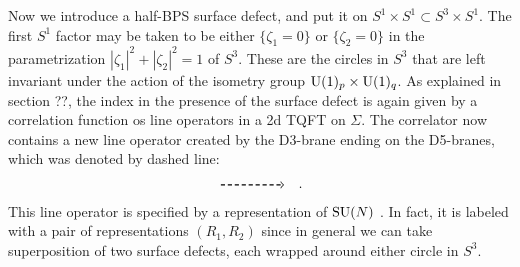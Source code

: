 Now we introduce a half-BPS surface defect, and put it on $S^{1} \times S^{1} \subset S^{3} \times S^{1}$.
The first $S^{1}$ factor may be taken to be either $\{\zeta_{1}=0\}$
or $\{\zeta_{2}=0\}$ in the parametrization $\left|\zeta_{1}\right|^{2}+\left|\zeta_{2}\right|^{2}=1$
of $S^{3}$. These are the circles in $S^{3}$ that are left invariant
under the action of the isometry group $\mathrm{U}(1)_{p} \times \mathrm{U}(1)_{q}$.
As explained in section ??, the index in the presence of the surface
defect is again given by a correlation function os line operators
in a 2d TQFT on $\Sigma$. The correlator now contains a new line
operator created by the D3-brane ending on the D5-branes, which was
denoted by dashed line:
\begin{equation}
    \begin{tikzpicture}[scale=1, baseline=(x.base)]    \node (x) at (0,0) {\vphantom{x}};

        \draw[thick, densely dashed, ->] (0,0) -- (1.6,0);

    \end{tikzpicture}
  \quad .
\end{equation}
 This line operator is specified by a representation of $\mathrm{SU}(N)$
 \cite{Gukov:2006jk,Gukov:2008sn,Gadde:2013dda}.
 In fact, it is labeled with a pair of representations
$(R_{1},R_{2})$ since in general we can take superposition of two
surface defects, each wrapped around either circle in $S^{3}$.

